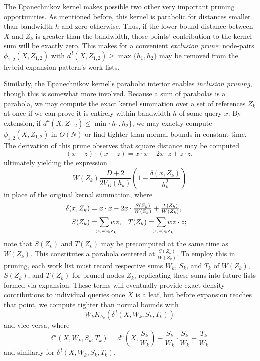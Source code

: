 \documentclass[twoside,leqno,twocolumn]{article}
\newcommand{\lo}[1]{#1^{\,l}}
\newcommand{\hi}[1]{#1^u}
\newcommand{\leftlim}[1]{\lefteqn{\scriptscriptstyle #1}}
\begin{document}
The Epanechnikov kernel makes possible two other very important
pruning opportunities.  As mentioned before, this kernel is parabolic
for distances smaller than bandwidth $h$ and zero otherwise.  Thus, if
the lower-bound distance between $X$ and $Z_k$ is greater than the
bandwidth, those points' contribution to the kernel sum will be
exactly zero.  This makes for a convenient {\em exclusion prune}:
node-pairs $\phi_{1,2}(X,Z_{1,2})$ with $\lo{d}(X,Z_{1,2}) \geq
\max\{h_1,h_2\}$ may be removed from the hybrid expansion pattern's
work lists.

Similarly, the Epanechnikov kernel's parabolic interior enables {\em
inclusion pruning}, though this is somewhat more involved.  Because a
sum of parabolas is a parabola, we may compute the exact kernel
summation over a set of references $Z_k$ at once if we can prove it is
entirely within bandwidth $h$ of some query $x$.  By extension, if
$\hi{d}(X,Z_{1,2}) \leq \min\{h_1,h_2\}$, we may exactly compute
$\phi_{1,2}(X,Z_{1,2})$ in $O(N)$ or find tighter than normal bounds
in constant time.  The derivation of this prune observes that square
distance may be computed
\begin{equation}
  (x - z) \cdot (x - z) = x \cdot x - 2 x \cdot z + z \cdot z ,
\end{equation}
ultimately yielding the expression
\begin{equation}
  W(Z_k) \frac{D + 2}{2 V_D(h_k)} \left( 1 - \frac{\delta(x,Z_k)}{h_k^2} \right)
\end{equation}
in place of the original kernal summation, where
\begin{align}
  \delta(x,Z_k) & = \lefteqn{\textstyle x \cdot x - 2x \cdot \frac{S(Z_k)}{W(Z_k)} + \frac{T(Z_k)}{W(Z_k)} ,} \\
  S(Z_k) & = \sum_{\leftlim{(z,w) \in Z_k}} w z , & T(Z_k) & = \sum_{\leftlim{(z,w) \in Z_k}} w z \cdot z ;
\end{align}
note that $S(Z_k)$ and $T(Z_k)$ may be precomputed at the same time as
$W(Z_k)$.  This constitutes a parabola centered at
$\frac{S(Z_k)}{W(Z_k)}$.  To employ this in pruning, each work list
must record respective sums $W_k$, $S_k$, and $T_k$ of $W(Z_k)$,
$S(Z_k)$, and $T(Z_k)$ for pruned nodes $Z_k$, replicating these sums
into future lists formed via expansion.  These terms will eventually
provide exact density contributions to individual queries once $X$ is
a leaf, but before expansion reaches that point, we compute tighter
than normal bounds with
\begin{equation}
  W_k K_{h_k}(\lo{\delta}(X,W_k,S_k,T_k))
\end{equation}
and vice versa, where
\begin{equation}
  \textstyle \hi{\delta}(X,W_k,S_k,T_k) = \hi{d} \! \left( X,\frac{S_k}{W_k} \right) - \frac{S_k}{W_k} \cdot \frac{S_k}{W_k} + \frac{T_k}{W_k}
\end{equation}
and similarly for $\lo{\delta}(X,W_k,S_k,T_k)$.
\end{document}
